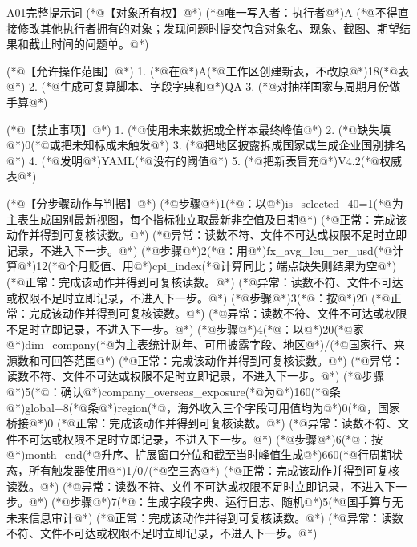\documentclass[UTF8,openany,zihao=-4]{ctexbook}
\renewcommand{\_}{\textunderscore\allowbreak}
\begin{document}
\begin{PromptBox}{A01完整提示词}
(*@{\promptcjk 【对象所有权】}@*)
(*@{\promptcjk 唯一写入者：执行者}@*)A
(*@{\promptcjk 不得直接修改其他执行者拥有的对象；发现问题时提交包含对象名、现象、截图、期望结果和截止时间的问题单。}@*)

(*@{\promptcjk 【允许操作范围】}@*)
1. (*@{\promptcjk 在}@*)A(*@{\promptcjk 工作区创建新表，不改原}@*)18(*@{\promptcjk 表}@*)
2. (*@{\promptcjk 生成可复算脚本、字段字典和}@*)QA
3. (*@{\promptcjk 对抽样国家与周期月份做手算}@*)

(*@{\promptcjk 【禁止事项】}@*)
1. (*@{\promptcjk 使用未来数据或全样本最终峰值}@*)
2. (*@{\promptcjk 缺失填}@*)0(*@{\promptcjk 或把未知标成未触发}@*)
3. (*@{\promptcjk 把地区披露拆成国家或生成企业国别排名}@*)
4. (*@{\promptcjk 发明}@*)YAML(*@{\promptcjk 没有的阈值}@*)
5. (*@{\promptcjk 把新表冒充}@*)V4.2(*@{\promptcjk 权威表}@*)

(*@{\promptcjk 【分步骤动作与判据】}@*)
(*@{\promptcjk 步骤}@*)1(*@{\promptcjk ：以}@*)is_selected_40=1(*@{\promptcjk 为主表生成国别最新视图，每个指标独立取最新非空值及日期}@*)
  (*@{\promptcjk 正常：完成该动作并得到可复核读数。}@*)
  (*@{\promptcjk 异常：读数不符、文件不可达或权限不足时立即记录，不进入下一步。}@*)
(*@{\promptcjk 步骤}@*)2(*@{\promptcjk ：用}@*)fx_avg_lcu_per_usd(*@{\promptcjk 计算}@*)12(*@{\promptcjk 个月贬值、用}@*)cpi_index(*@{\promptcjk 计算同比；端点缺失则结果为空}@*)
  (*@{\promptcjk 正常：完成该动作并得到可复核读数。}@*)
  (*@{\promptcjk 异常：读数不符、文件不可达或权限不足时立即记录，不进入下一步。}@*)
(*@{\promptcjk 步骤}@*)3(*@{\promptcjk ：按}@*)20%
  (*@{\promptcjk 正常：完成该动作并得到可复核读数。}@*)
  (*@{\promptcjk 异常：读数不符、文件不可达或权限不足时立即记录，不进入下一步。}@*)
(*@{\promptcjk 步骤}@*)4(*@{\promptcjk ：以}@*)20(*@{\promptcjk 家}@*)dim_company(*@{\promptcjk 为主表统计财年、可用披露字段、地区}@*)/(*@{\promptcjk 国家行、来源数和可回答范围}@*)
  (*@{\promptcjk 正常：完成该动作并得到可复核读数。}@*)
  (*@{\promptcjk 异常：读数不符、文件不可达或权限不足时立即记录，不进入下一步。}@*)
(*@{\promptcjk 步骤}@*)5(*@{\promptcjk ：确认}@*)company_overseas_exposure(*@{\promptcjk 为}@*)160(*@{\promptcjk 条}@*)global+8(*@{\promptcjk 条}@*)region(*@{\promptcjk ，海外收入三个字段可用值均为}@*)0(*@{\promptcjk ，国家桥接}@*)0
  (*@{\promptcjk 正常：完成该动作并得到可复核读数。}@*)
  (*@{\promptcjk 异常：读数不符、文件不可达或权限不足时立即记录，不进入下一步。}@*)
(*@{\promptcjk 步骤}@*)6(*@{\promptcjk ：按}@*)month_end(*@{\promptcjk 升序、扩展窗口分位和截至当时峰值生成}@*)660(*@{\promptcjk 行周期状态，所有触发器使用}@*)1/0/(*@{\promptcjk 空三态}@*)
  (*@{\promptcjk 正常：完成该动作并得到可复核读数。}@*)
  (*@{\promptcjk 异常：读数不符、文件不可达或权限不足时立即记录，不进入下一步。}@*)
(*@{\promptcjk 步骤}@*)7(*@{\promptcjk ：生成字段字典、运行日志、随机}@*)5(*@{\promptcjk 国手算与无未来信息审计}@*)
  (*@{\promptcjk 正常：完成该动作并得到可复核读数。}@*)
  (*@{\promptcjk 异常：读数不符、文件不可达或权限不足时立即记录，不进入下一步。}@*)


\end{PromptBox}
\end{document}
